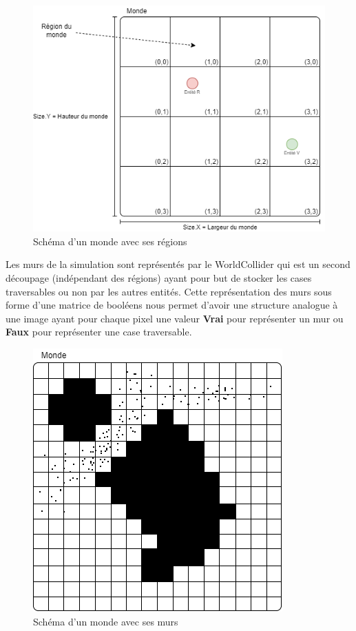 \documentclass{EPUProjetDi}
\begin{document}
\begin{figure}[h]
    \centering
    \includegraphics[scale=0.5]{world.png}
    \caption{Schéma d'un monde avec ses régions}
    \label{fig:world_scheme}
\end{figure}

Les murs de la simulation sont représentés par le WorldCollider qui est un second découpage (indépendant des régions) ayant pour but 
de stocker les cases traversables ou non par les autres entités.
Cette représentation des murs sous forme d'une matrice de booléens nous permet d'avoir une structure analogue à une image ayant pour chaque pixel
une valeur \textbf{Vrai} pour représenter un mur ou \textbf{Faux} pour représenter une case traversable.

\begin{figure}[h]
    \centering
    \includegraphics[scale=0.4]{world_collider.png}
    \caption{Schéma d'un monde avec ses murs }
    \label{fig:world_collider_scheme}
\end{figure}
\end{document}
